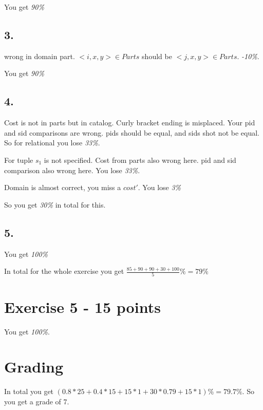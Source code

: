 \documentclass[12pt,a4paper,oneside]{report}
\begin{document}
You get \textit{90\%}
\subsection*{3.}
wrong in domain part. $<i,x,y> \in Parts$ should be $<j,x,y> \in Parts$. \textit{-10\%}.

You get \textit{90\%}

\subsection*{4.}
Cost is not in parts but in catalog.
Curly bracket ending is misplaced.
Your pid and sid comparisons are wrong. pids should be equal, and sids shot not be equal.
So for relational you lose \textit{33\%}.

For tuple $s_1$ is not specified. Cost from parts also wrong here.
pid and sid comparison also wrong here.
You lose \textit{33\%}.

Domain is almost correct, you miss a $cost'$. You lose \textit{3\%}

So you get \textit{30\%} in total for this. 

\subsection*{5.}
You get \textit{100\%}


In total for the whole exercise you get $\frac{85 + 90 + 90 + 30 + 100}{5}\% = 79\%$

\section*{Exercise 5 - 15 points}
You get \textit{100\%}.

\section*{Grading}
In total you get $(0.8*25 + 0.4*15 + 15*1 + 30*0.79 + 15*1)\%= 79.7\%$.
So you get a grade of 7.
\end{document}
